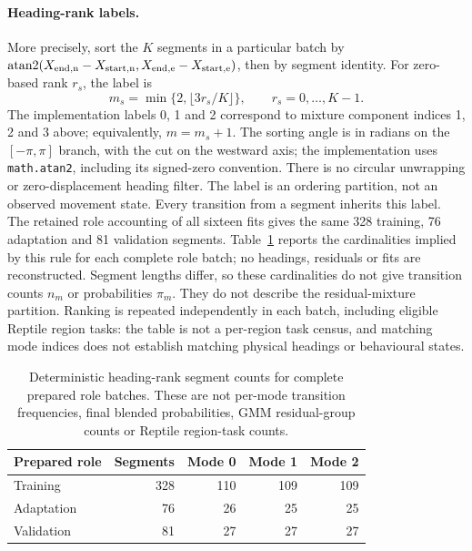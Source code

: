 \documentclass[11pt]{article}
\begin{document}
\paragraph{Heading-rank labels.}
More precisely, sort the \(K\) segments in a particular batch by
\(\operatorname{atan2}(X_{\rm end,n}-X_{\rm start,n},
X_{\rm end,e}-X_{\rm start,e})\), then by segment identity. For zero-based
rank \(r_s\), the label is
\begin{equation}
 m_s=\min\{2,\lfloor 3r_s/K\rfloor\},\qquad r_s=0,\ldots,K-1.
 \label{eq:segment-rank-mode}
\end{equation}
The implementation labels 0, 1 and 2 correspond to mixture component
indices 1, 2 and 3 above; equivalently, \(m=m_s+1\).
The sorting angle is in radians on the \([-\pi,\pi]\) branch, with the
cut on the westward axis; the implementation uses \texttt{math.atan2},
including its signed-zero convention. There is no circular unwrapping or
zero-displacement heading filter. The label is an ordering partition,
not an observed movement state.
Every transition from a segment inherits this label. The retained role
accounting of all sixteen fits gives the same 328 training, 76 adaptation
and 81 validation segments. Table~\ref{tab:mode-rank-cardinality} reports
the cardinalities implied by this rule for each complete role batch;
no headings, residuals or fits are reconstructed. Segment lengths differ,
so these cardinalities do not give transition counts \(n_m\) or probabilities
\(\pi_m\). They do not describe the residual-mixture partition. Ranking is
repeated independently in each batch, including eligible Reptile region
tasks: the table is not a per-region task census, and matching mode indices
does not establish matching physical headings or behavioural states.

\begin{table}[htbp]
\centering\small
\caption{Deterministic heading-rank segment counts for complete prepared
role batches. These are not per-mode transition frequencies, final blended
probabilities, GMM residual-group counts or Reptile region-task counts.}
\label{tab:mode-rank-cardinality}
\begin{tabular}{lrrrr}
\toprule
Prepared role & Segments & Mode 0 & Mode 1 & Mode 2\\
\midrule
Training & 328 & 110 & 109 & 109\\
Adaptation & 76 & 26 & 25 & 25\\
Validation & 81 & 27 & 27 & 27\\
\bottomrule
\end{tabular}
\end{table}
\end{document}

